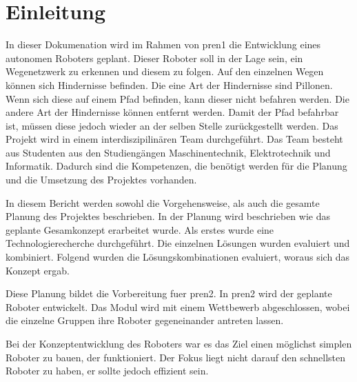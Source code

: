 \section{Einleitung}

In dieser Dokumenation wird im Rahmen von \acrfull{pren1} die Entwicklung eines autonomen Roboters geplant. Dieser Roboter soll in der Lage sein, ein Wegenetzwerk zu erkennen und diesem zu folgen. Auf den einzelnen Wegen können sich Hindernisse befinden. Die eine Art der Hindernisse sind Pillonen. Wenn sich diese auf einem Pfad befinden, kann dieser nicht befahren werden. Die andere Art der Hindernisse können entfernt werden. Damit der Pfad befahrbar ist, müssen diese jedoch wieder an der selben Stelle zurückgestellt werden.
Das Projekt wird in einem interdiszipilinären Team durchgeführt. Das Team besteht aus Studenten aus den Studiengängen Maschinentechnik, Elektrotechnik und Informatik. Dadurch sind die Kompetenzen, die benötigt werden für die Planung und die Umsetzung des Projektes vorhanden.

In diesem Bericht werden sowohl die Vorgehensweise, als auch die gesamte Planung des Projektes beschrieben. In der Planung wird beschrieben wie das geplante Gesamkonzept erarbeitet wurde. Als erstes wurde eine Technologierecherche durchgeführt. Die einzelnen Lösungen wurden evaluiert und kombiniert. Folgend wurden die Lösungskombinationen evaluiert, woraus sich das Konzept ergab.

Diese Planung bildet die Vorbereitung fuer \acrfull{pren2}. In \acrshort{pren2} wird der geplante Roboter entwickelt. Das Modul wird mit einem Wettbewerb abgeschlossen, wobei die einzelne Gruppen ihre Roboter gegeneinander antreten lassen.

Bei der Konzeptentwicklung des Roboters war es das Ziel einen möglichst simplen Roboter zu bauen, der funktioniert. Der Fokus liegt nicht darauf den schnellsten Roboter zu haben, er sollte jedoch effizient sein.